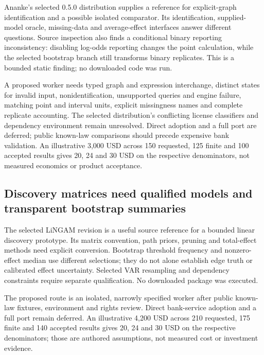 Ananke's selected 0.5.0 distribution supplies a reference for
explicit-graph identification and a possible isolated comparator. Its
identification, supplied-model oracle, missing-data and average-effect
interfaces answer different questions. Source inspection also finds a
conditional binary reporting inconsistency: disabling log-odds reporting
changes the point calculation, while the selected bootstrap branch still
transforms binary replicates. This is a bounded static finding; no
downloaded code was run.
\citep{exec24_ananke_source,exec24_ananke_choice}

A proposed worker needs typed graph and expression interchange, distinct
states for invalid input, nonidentification, unsupported queries and
engine failure, matching point and interval units, explicit missingness
names and complete replicate accounting. The selected distribution's
conflicting license classifiers and dependency environment remain
unresolved. Direct adoption and a full port are deferred; public
known-law comparisons should precede expensive bank validation. An
illustrative 3,000 USD across 150 requested, 125 finite and 100 accepted
results gives 20, 24 and 30 USD on the respective denominators, not
measured economics or product acceptance.\citep{exec24_ananke_choice}

\hypertarget{discovery-matrices-need-qualified-models-and-transparent-bootstrap-summaries}{%
\subsection{Discovery matrices need qualified models and transparent
bootstrap
summaries}\label{discovery-matrices-need-qualified-models-and-transparent-bootstrap-summaries}}

The selected LiNGAM revision is a useful source reference for a bounded
linear discovery prototype. Its matrix convention, path priors, pruning
and total-effect methods need explicit conversion. Bootstrap threshold
frequency and nonzero-effect median use different selections; they do
not alone establish edge truth or calibrated effect uncertainty.
Selected VAR resampling and dependency constraints require separate
qualification. No downloaded package was executed.
\citep{exec24_lingam_source,exec24_lingam_choice}

The proposed route is an isolated, narrowly specified worker after
public known-law fixtures, environment and rights review. Direct
bank-service adoption and a full port remain deferred. An illustrative
4,200 USD across 210 requested, 175 finite and 140 accepted results
gives 20, 24 and 30 USD on the respective denominators; those are
authored assumptions, not measured cost or investment
evidence.\citep{exec24_lingam_choice}

